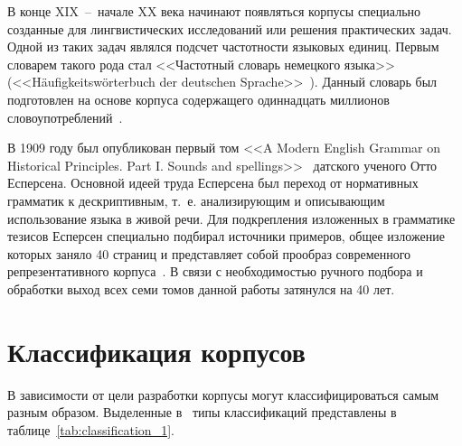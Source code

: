 В конце XIX~--~начале XX века начинают появляться корпусы специально созданные для лингвистических исследований или решения практических задач. Одной из таких задач являлся подсчет частотности языковых единиц. Первым словарем такого рода стал <<Частотный словарь немецкого языка>> (<<H\"aufigkeitsw\"orterbuch der deutschen Sprache>>~\cite{Kaeding}). Данный словарь был подготовлен на основе корпуса содержащего одиннадцать миллионов словоупотреблений~\cite{Kopotev}. 

В 1909 году был опубликован первый том <<A Modern English Grammar on Historical Principles. Part I. Sounds and spellings>>~\cite{Jespersen} датского ученого Отто Есперсена. Основной идеей труда Есперсена был переход от нормативных грамматик к дескриптивным, т.~е. анализирующим и описывающим использование языка в живой речи. Для подкрепления изложенных в грамматике тезисов Есперсен специально подбирал источники примеров, общее изложение которых заняло 40 страниц и представляет собой прообраз современного репрезентативного корпуса~\cite{Kopotev}. В связи с необходимостью ручного подбора и обработки выход всех семи томов данной работы затянулся на 40 лет.

\section{Классификация корпусов}

В зависимости от цели разработки корпусы могут классифицироваться самым разным образом. Выделенные в~\cite{Zaharov} типы классификаций представлены в таблице~\ref{tab:classification_1}.

